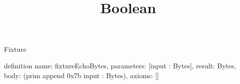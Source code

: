 \begin{lexlean}{Fixture}
\title{Boolean}
\begin{semanticmodule}
definition{
  name: fixtureEchoBytes,
  parameters: [input : Bytes],
  result: Bytes,
  body: (prim append 0x7b input : Bytes),
  axioms: []
}
\end{semanticmodule}
\end{lexlean}
